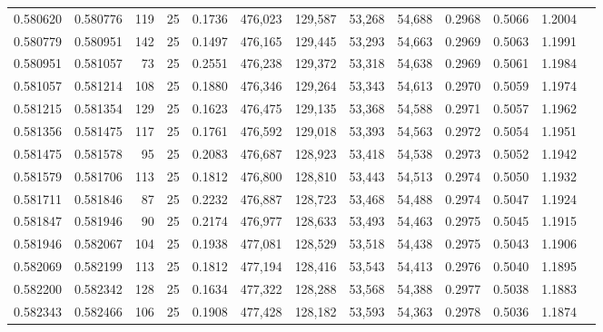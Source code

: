 \begin{tabular}{rrrrrrrrrrrrr}
0.580620 & 0.580776 &   119 &  25 &                                     0.1736 & 476,023 & 129,587 &  53,268 &  54,688 & 0.2968 & 0.5066 & 1.2004 \\
0.580779 & 0.580951 &   142 &  25 &                                     0.1497 & 476,165 & 129,445 &  53,293 &  54,663 & 0.2969 & 0.5063 & 1.1991 \\
0.580951 & 0.581057 &    73 &  25 &                                     0.2551 & 476,238 & 129,372 &  53,318 &  54,638 & 0.2969 & 0.5061 & 1.1984 \\
0.581057 & 0.581214 &   108 &  25 &                                     0.1880 & 476,346 & 129,264 &  53,343 &  54,613 & 0.2970 & 0.5059 & 1.1974 \\
0.581215 & 0.581354 &   129 &  25 &                                     0.1623 & 476,475 & 129,135 &  53,368 &  54,588 & 0.2971 & 0.5057 & 1.1962 \\
0.581356 & 0.581475 &   117 &  25 &                                     0.1761 & 476,592 & 129,018 &  53,393 &  54,563 & 0.2972 & 0.5054 & 1.1951 \\
0.581475 & 0.581578 &    95 &  25 &                                     0.2083 & 476,687 & 128,923 &  53,418 &  54,538 & 0.2973 & 0.5052 & 1.1942 \\
0.581579 & 0.581706 &   113 &  25 &                                     0.1812 & 476,800 & 128,810 &  53,443 &  54,513 & 0.2974 & 0.5050 & 1.1932 \\
0.581711 & 0.581846 &    87 &  25 &                                     0.2232 & 476,887 & 128,723 &  53,468 &  54,488 & 0.2974 & 0.5047 & 1.1924 \\
0.581847 & 0.581946 &    90 &  25 &                                     0.2174 & 476,977 & 128,633 &  53,493 &  54,463 & 0.2975 & 0.5045 & 1.1915 \\
0.581946 & 0.582067 &   104 &  25 &                                     0.1938 & 477,081 & 128,529 &  53,518 &  54,438 & 0.2975 & 0.5043 & 1.1906 \\
0.582069 & 0.582199 &   113 &  25 &                                     0.1812 & 477,194 & 128,416 &  53,543 &  54,413 & 0.2976 & 0.5040 & 1.1895 \\
0.582200 & 0.582342 &   128 &  25 &                                     0.1634 & 477,322 & 128,288 &  53,568 &  54,388 & 0.2977 & 0.5038 & 1.1883 \\
0.582343 & 0.582466 &   106 &  25 &                                     0.1908 & 477,428 & 128,182 &  53,593 &  54,363 & 0.2978 & 0.5036 & 1.1874 \\

\end{tabular}

